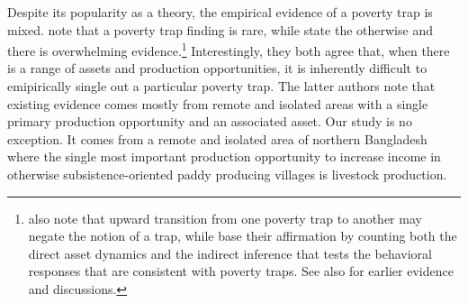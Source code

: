 	Despite its popularity as a theory, the empirical evidence of a poverty trap is mixed. \citet[][p.129]{KraayMcKenzie2014} note that a poverty trap finding is rare, while \citet[][p.321]{BarrettGargMcBride2016} state the otherwise and there is overwhelming evidence.\footnote{\citet{KraayMcKenzie2014} also note that upward transition from one poverty trap to another may negate the notion of a trap, while \citet{BarrettGargMcBride2016} base their affirmation by counting both the direct asset dynamics and the indirect inference that tests the behavioral responses that are consistent with poverty traps. See also \citet{CarterBarrett2006, BarrettCarter2013} for earlier evidence and discussions. } Interestingly, they both agree that, when there is a range of assets and production opportunities, it is inherently difficult to emipirically single out a particular poverty trap. The latter authors note that existing evidence comes mostly from remote and isolated areas with a single primary production opportunity and an associated asset. Our study is no exception. It comes from a remote and isolated area of northern Bangladesh where the single most important production opportunity to increase income in otherwise subsistence-oriented paddy producing villages is livestock production.  \citet[][Figure IV]{Balboni2020} 


